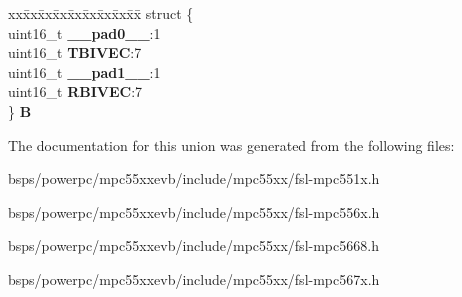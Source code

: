 \begin{DoxyCompactItemize}
\begin{tabbing}
\end{tabbing}\item 
\mbox{\label{unionuMBIVEC_a385e066a0dd0618ea19218b7dab8a192}} 
\begin{tabbing}
xx\=xx\=xx\=xx\=xx\=xx\=xx\=xx\=xx\=\kill
struct \{\\
\>uint16\_t {\bfseries \_\_pad0\_\_}:1\\
\>uint16\_t {\bfseries TBIVEC}:7\\
\>uint16\_t {\bfseries \_\_pad1\_\_}:1\\
\>uint16\_t {\bfseries RBIVEC}:7\\
\} {\bfseries B}\\

\end{tabbing}\end{DoxyCompactItemize}


The documentation for this union was generated from the following files\+:\begin{DoxyCompactItemize}
\item 
bsps/powerpc/mpc55xxevb/include/mpc55xx/fsl-\/mpc551x.\+h\item 
bsps/powerpc/mpc55xxevb/include/mpc55xx/fsl-\/mpc556x.\+h\item 
bsps/powerpc/mpc55xxevb/include/mpc55xx/fsl-\/mpc5668.\+h\item 
bsps/powerpc/mpc55xxevb/include/mpc55xx/fsl-\/mpc567x.\+h\end{DoxyCompactItemize}
